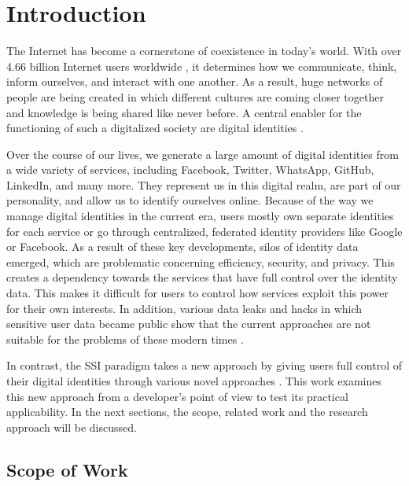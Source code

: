 \chapter{Introduction}
	The Internet has become a cornerstone of coexistence in today's world. With over 4.66 billion Internet users worldwide \cite{johnson_internet_2021}, it determines how we communicate, think, inform ourselves, and interact with one another.	As a result, huge networks of people are being created in which different cultures are coming closer together and knowledge is being shared like never before. A central enabler for the functioning of such a digitalized society are digital identities \cite{liu_blockchain-based_2020}.
	
	Over the course of our lives, we generate a large amount of digital identities from a wide variety of services, including Facebook, Twitter, WhatsApp, GitHub, LinkedIn, and many more. They represent us in this digital realm, are part of our personality, and allow us to identify ourselves online. Because of the way we manage digital identities in the current era, users mostly own separate identities for each service or go through centralized, federated identity providers like Google or Facebook. As a result of these key developments, silos of identity data emerged, which are problematic concerning efficiency, security, and privacy. This creates a dependency towards the services that have full control over the identity data. This makes it difficult for users to control how services exploit this power for their own interests. In addition, various data leaks and hacks in which sensitive user data became public show that the current approaches are not suitable for the problems of these modern times \cite{swinhoe_15_2021}. \cite[pp. 2-3]{ehrlich_self-sovereign_2021}
	
	In contrast, the \ac{SSI} paradigm takes a new approach by giving users full control of their digital identities through various novel approaches \cite[p. 103059]{ferdous_search_2019}. This work examines this new approach from a developer's point of view to test its practical applicability. In the next sections, the scope, related work and the research approach will be discussed.
	
	\section{Scope of Work}\label{section: Scope of Work} %
	

